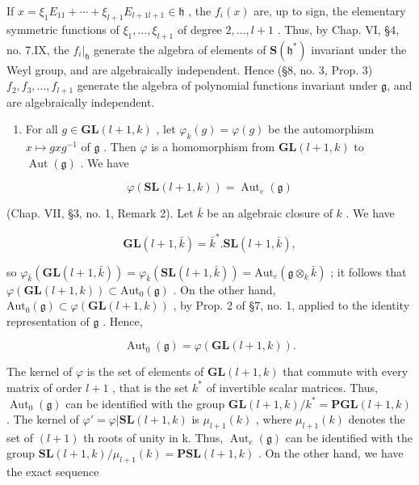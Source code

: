 If \(x = \xi_{1}E_{11} + \cdots + \xi_{l+1}E_{l+1 l+1} \in \mathfrak{h}\) , the \(f_{i}(x)\) are, up to sign, the elementary symmetric functions of \(\xi_{1}, \ldots, \xi_{l+1}\) of degree \(2, \ldots, l + 1\) . Thus, by Chap. VI, §4, no. 7.IX, the \(f_{i}|_{\mathfrak{h}}\) generate the algebra of elements of \(\mathbf{S}(\mathfrak{h}^{*})\) invariant under the Weyl group, and are algebraically independent. Hence (§8, no. 3, Prop. 3) \(f_{2}, f_{3}, \ldots, f_{l+1}\) generate the algebra of polynomial functions invariant under \(\mathfrak{g}\), and are algebraically independent.

\begin{enumerate}
\def\labelenumi{(\Roman{enumi})}
\setcounter{enumi}{6}
\tightlist
\item
  For all \(g \in \mathbf{GL}(l + 1, k)\) , let \(\varphi_k(g) = \varphi(g)\) be the automorphism \(x \mapsto gxg^{-1}\) of \(\mathfrak{g}\) . Then \(\varphi\) is a homomorphism from \(\mathbf{GL}(l + 1, k)\) to \(\operatorname{Aut}(\mathfrak{g})\) . We have
\end{enumerate}

\[
\varphi (\mathbf {S L} (l + 1, k)) = \operatorname{Aut} _ {e} (\mathfrak {g})
\]

(Chap. VII, §3, no. 1, Remark 2). Let \(\bar{k}\) be an algebraic closure of \(k\) . We have

\[
\mathbf {G L} (l + 1, \bar {k}) = \bar {k} ^ {*}. \mathbf {S L} (l + 1, \bar {k}),
\]

so \(\varphi_{\bar{k}}(\mathbf{GL}(l + 1,\bar{k})) = \varphi_{\bar{k}}(\mathbf{SL}(l + 1,\bar{k})) = \mathrm{Aut}_e(\mathfrak{g}\otimes_k\bar{k})\) ; it follows that \(\varphi (\mathbf{GL}(l + 1,k))\subset \mathrm{Aut}_0(\mathfrak{g})\) . On the other hand, \(\mathrm{Aut}_0(\mathfrak{g})\subset \varphi (\mathbf{GL}(l + 1,k))\) , by Prop. 2 of §7, no. 1, applied to the identity representation of \(\mathfrak{g}\) . Hence,

\[
\operatorname{Aut} _ {0} (\mathfrak {g}) = \varphi (\mathbf {G L} (l + 1, k)).
\]

The kernel of \(\varphi\) is the set of elements of \(\mathbf{GL}(l+1,k)\) that commute with every matrix of order \(l+1\) , that is the set \(k^{*}\) of invertible scalar matrices. Thus, \(\operatorname{Aut}_{0}(\mathfrak{g})\) can be identified with the group \(\mathbf{GL}(l+1,k)/k^{*}=\mathbf{PGL}(l+1,k)\) . The kernel of \(\varphi'=\varphi|\mathbf{SL}(l+1,k)\) is \(\mu_{l+1}(k)\) , where \(\mu_{l+1}(k)\) denotes the set of \((l+1)\) th roots of unity in k. Thus, \(\operatorname{Aut}_{e}(\mathfrak{g})\) can be identified with the group \(\mathbf{SL}(l+1,k)/\mu_{l+1}(k)=\mathbf{PSL}(l+1,k)\) . On the other hand, we have the exact sequence

